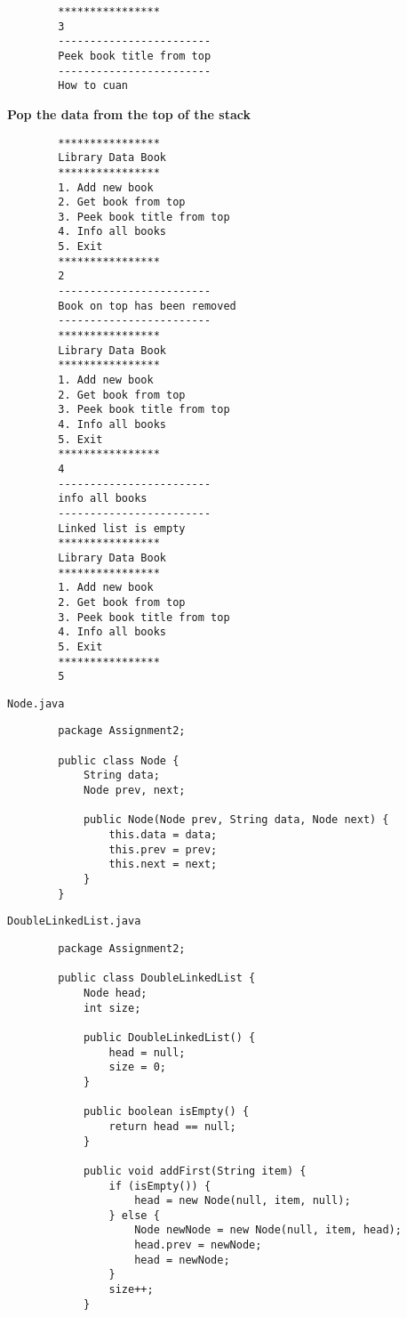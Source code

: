\documentclass[12pt,titlepage]{article}
\begin{document}
\begin{enumerate}
\begin{verbatim}
        ****************
        3
        ------------------------
        Peek book title from top
        ------------------------
        How to cuan
    \end{verbatim}
    \textbf{Pop the data from the top of the stack}
    \begin{verbatim}
        ****************
        Library Data Book
        ****************
        1. Add new book
        2. Get book from top
        3. Peek book title from top
        4. Info all books
        5. Exit
        ****************
        2
        ------------------------
        Book on top has been removed
        ------------------------
        ****************
        Library Data Book
        ****************
        1. Add new book
        2. Get book from top
        3. Peek book title from top
        4. Info all books
        5. Exit
        ****************
        4
        ------------------------
        info all books
        ------------------------
        Linked list is empty
        ****************
        Library Data Book
        ****************
        1. Add new book
        2. Get book from top
        3. Peek book title from top
        4. Info all books
        5. Exit
        ****************
        5
    \end{verbatim}
    \texttt{Node.java}
    \begin{verbatim}
        package Assignment2;

        public class Node {
            String data;
            Node prev, next;

            public Node(Node prev, String data, Node next) {
                this.data = data;
                this.prev = prev;
                this.next = next;
            }
        }
    \end{verbatim}
    \texttt{DoubleLinkedList.java}
    \begin{verbatim}
        package Assignment2;

        public class DoubleLinkedList {
            Node head;
            int size;

            public DoubleLinkedList() {
                head = null;
                size = 0;
            }

            public boolean isEmpty() {
                return head == null;
            }

            public void addFirst(String item) {
                if (isEmpty()) {
                    head = new Node(null, item, null);
                } else {
                    Node newNode = new Node(null, item, head);
                    head.prev = newNode;
                    head = newNode;
                }
                size++;
            }


\end{verbatim}
\end{enumerate}
\end{document}
